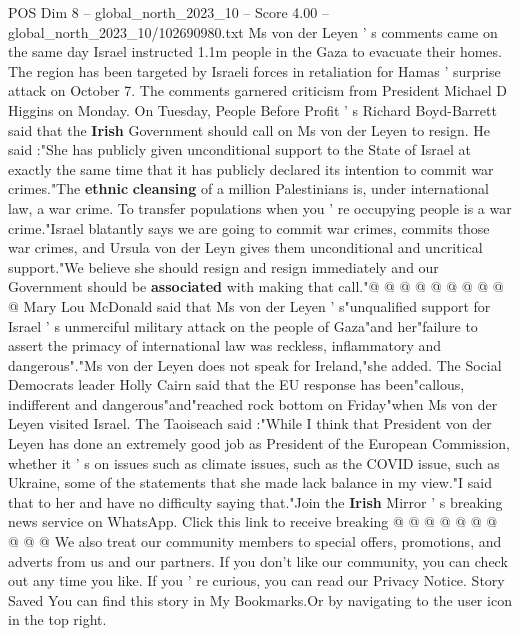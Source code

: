 \begin{textsample}{POS Dim 8 – global\_north\_2023\_10 – Score 4.00 – global\_north\_2023\_10/102690980.txt}  \label{ex:f8_pos_203}
Ms von der Leyen ' s comments came on the same day Israel instructed 1.1m people in the Gaza to evacuate their homes.
The region has been targeted by Israeli forces in retaliation for Hamas ' surprise attack on October 7.
The comments garnered criticism from President Michael D Higgins on Monday.
On Tuesday, People Before Profit ' s Richard Boyd-Barrett said that the \textbf{Irish} Government should call on Ms von der Leyen to resign.
He said :"She has publicly given unconditional support to the State of Israel at exactly the same time that it has publicly declared its intention to commit war crimes."The \textbf{ethnic} \textbf{cleansing} of a million Palestinians is, under international law, a war crime.
To transfer populations when you ' re occupying people is a war crime."Israel blatantly says we are going to commit war crimes, commits those war crimes, and Ursula von der Leyn gives them unconditional and uncritical support."We believe she should resign and resign immediately and our Government should be \textbf{associated} with making that call."@ @ @ @ @ @ @ @ @ @ Mary Lou McDonald said that Ms von der Leyen ' s"unqualified support for Israel ' s unmerciful military attack on the people of Gaza"and her"failure to assert the primacy of international law was reckless, inflammatory and dangerous"."Ms von der Leyen does not speak for Ireland,"she added.
The Social Democrats leader Holly Cairn said that the EU response has been"callous, indifferent and dangerous"and"reached rock bottom on Friday"when Ms von der Leyen visited Israel.
The Taoiseach said :"While I think that President von der Leyen has done an extremely good job as President of the European Commission, whether it ' s on issues such as climate issues, such as the COVID issue, such as Ukraine, some of the statements that she made lack balance in my view."I said that to her and have no difficulty saying that."Join the \textbf{Irish} Mirror ' s breaking news service on WhatsApp.
Click this link to receive breaking @ @ @ @ @ @ @ @ @ @ We also treat our community members to special offers, promotions, and adverts from us and our partners.
If you don't like our community, you can check out any time you like.
If you ' re curious, you can read our Privacy Notice.
Story Saved You can find this story in My Bookmarks.Or by navigating to the user icon in the top right.

\end{textsample}
